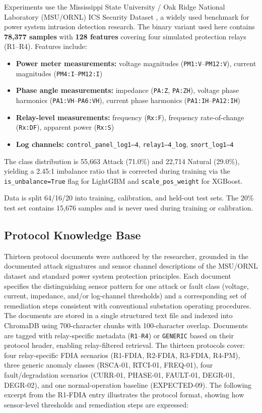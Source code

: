 \documentclass[twocolumn, 10pt, letterpaper]{article}
\begin{document}
Experiments use the Mississippi State University / Oak Ridge National Laboratory
(MSU/ORNL) ICS Security Dataset \cite{morris2014ics},
a widely used benchmark for power system intrusion detection research.
The binary variant used here contains \textbf{78,377 samples} with \textbf{128 features}
covering four simulated protection relays (R1--R4).
Features include:
\begin{itemize}
    \item \textbf{Power meter measurements:} voltage magnitudes (\texttt{PM1:V}--\texttt{PM12:V}), current magnitudes (\texttt{PM4:I}--\texttt{PM12:I})
    \item \textbf{Phase angle measurements:} impedance (\texttt{PA:Z}, \texttt{PA:ZH}), voltage phase harmonics (\texttt{PA1:VH}--\texttt{PA6:VH}), current phase harmonics (\texttt{PA1:IH}--\texttt{PA12:IH})
    \item \textbf{Relay-level measurements:} frequency (\texttt{Rx:F}), frequency rate-of-change (\texttt{Rx:DF}), apparent power (\texttt{Rx:S})
    \item \textbf{Log channels:} \texttt{control\_panel\_log1--4}, \texttt{relay1--4\_log}, \texttt{snort\_log1--4}
\end{itemize}
The class distribution is 55,663 Attack (71.0\%) and 22,714 Natural (29.0\%),
yielding a 2.45:1 imbalance ratio that is corrected during training via
the \texttt{is\_unbalance=True} flag for LightGBM and \texttt{scale\_pos\_weight}
for XGBoost.

Data is split 64/16/20 into training, calibration, and held-out test sets.
The 20\% test set contains 15,676 samples and is never used during training or calibration.

\subsection{Protocol Knowledge Base}

Thirteen protocol documents were authored by the researcher, grounded in the
documented attack signatures and sensor channel descriptions of the MSU/ORNL
dataset \cite{morris2014ics} and standard power system protection principles.
Each document specifies the distinguishing sensor pattern for one attack or fault
class (voltage, current, impedance, and/or log-channel thresholds) and a
corresponding set of remediation steps consistent with conventional substation
operating procedures.
The documents are stored in a single structured text file and indexed into
ChromaDB using 700-character chunks with 100-character overlap.
Documents are tagged with relay-specific metadata (\texttt{R1}--\texttt{R4})
or \texttt{GENERIC} based on their protocol header, enabling relay-filtered retrieval.
The thirteen protocols cover: four relay-specific FDIA scenarios (R1-FDIA, R2-FDIA,
R3-FDIA, R4-PM), three generic anomaly classes (RSCA-01, RTCI-01, FREQ-01),
four fault/degradation scenarios (CURR-01, PHASE-01, FAULT-01, DEGR-01, DEGR-02),
and one normal-operation baseline (EXPECTED-09).
The following excerpt from the R1-FDIA entry illustrates the protocol format,
showing how sensor-level thresholds and remediation steps are expressed:
\end{document}
